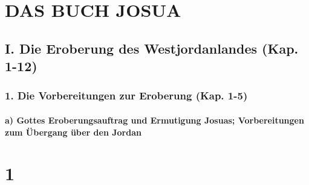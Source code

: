 \hypertarget{das-buch-josua}{%
\section{DAS BUCH JOSUA}\label{das-buch-josua}}

\hypertarget{i.-die-eroberung-des-westjordanlandes-kap.-1-12}{%
\subsection{I. Die Eroberung des Westjordanlandes (Kap.
1-12)}\label{i.-die-eroberung-des-westjordanlandes-kap.-1-12}}

\hypertarget{die-vorbereitungen-zur-eroberung-kap.-1-5}{%
\subsubsection{1. Die Vorbereitungen zur Eroberung (Kap.
1-5)}\label{die-vorbereitungen-zur-eroberung-kap.-1-5}}

\hypertarget{a-gottes-eroberungsauftrag-und-ermutigung-josuas-vorbereitungen-zum-uxfcbergang-uxfcber-den-jordan}{%
\paragraph{a) Gottes Eroberungsauftrag und Ermutigung Josuas;
Vorbereitungen zum Übergang über den
Jordan}\label{a-gottes-eroberungsauftrag-und-ermutigung-josuas-vorbereitungen-zum-uxfcbergang-uxfcber-den-jordan}}

\hypertarget{section}{%
\section{1}\label{section}}

